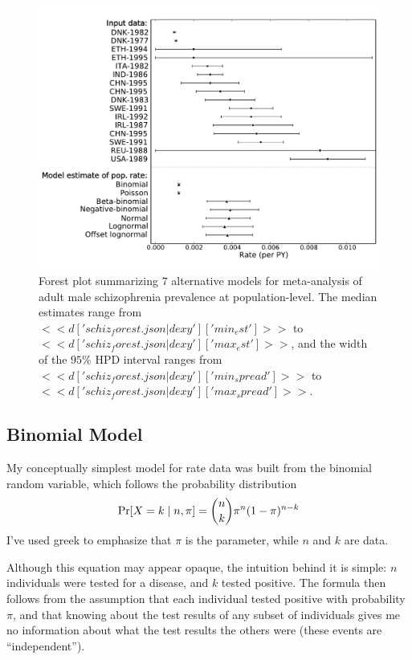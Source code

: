 \begin{figure}
\begin{center}
\includegraphics[width=\textwidth]{schiz_forest.pdf}
\end{center}
\caption{Forest plot summarizing $7$ alternative models for
  meta-analysis of adult male schizophrenia prevalence at
  population-level.  The median estimates range from
  $<<d['schiz_forest.json|dexy']['min_est']>>$ to
  $<<d['schiz_forest.json|dexy']['max_est']>>$, and the width of the
  $95\%$ HPD interval ranges from
  $<<d['schiz_forest.json|dexy']['min_spread']>>$ to
  $<<d['schiz_forest.json|dexy']['max_spread']>>$.}
\label{fig:theory-rate_model-schiz_forest}
\end{figure}

\subsection{Binomial Model}
My conceptually simplest model for rate data was built from the
binomial random variable, which follows the probability distribution
\[
\operatorname{Pr}[X=k\;|\; n,\pi] = \binom{n}{k}\pi^n(1-\pi)^{n-k}
\]
I've used greek to emphasize that $\pi$ is the parameter, while $n$
and $k$ are data.

Although this equation may appear opaque, the intuition behind it is
simple: $n$ individuals were tested for a disease, and $k$ tested
positive. The formula then follows from the assumption that each
individual tested positive with probability $\pi$, and that 
knowing about the test results of any subset of individuals gives me
no information about what the test results the others were
(these events are ``independent'').

